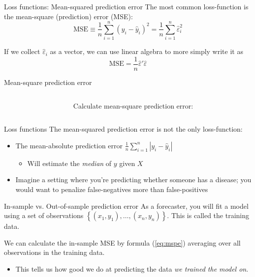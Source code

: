 \documentclass[aspectratio=169,t,11pt,table]{beamer}
\begin{document}
\begin{frame}{Loss functions: Mean-squared prediction error}
  The most common loss-function is the \alert{mean-square (prediction) error} (MSE):
  \begin{equation}\label{eq:mspe}
    \text{MSE} \equiv \frac{1}{n} \sum_{i=1}^n \left( y_i - \hat{y}_i \right)^2 = \frac{1}{n} \sum_{i=1}^n \hat{\varepsilon}_i^2
  \end{equation}

  \bigskip
  \pause
  If we collect $\hat{\varepsilon}_i$ as a vector, we can use linear algebra to more simply write it as 
  $$
    \text{MSE} = \frac{1}{n} \hat{\varepsilon}' \hat{\varepsilon}
  $$
\end{frame}

\begin{frame}{Mean-square prediction error}
  \begin{columns}[T]
    \begin{column}{.3\textwidth}\vspace*{-\bigskipamount}
      
    \end{column}
    \hfill
    \begin{column}{.6\textwidth}
      Calculate mean-square prediction error:

    \end{column}
  \end{columns}
\end{frame}

\begin{frame}{Loss functions}
  The mean-squared prediction error is not the only loss-function:
  \begin{itemize}
    \item The mean-absolute prediction error $\frac{1}{n} \sum_{i=1}^n \left\vert y_i - \hat{y}_i \right\vert$ 
    \begin{itemize}
      \item Will estimate the \emph{median} of $y$ given $X$
    \end{itemize}
    
    \pause
    \item Imagine a setting where you're predicting whether someone has a disease; you would want to penalize false-negatives more than false-positives
  \end{itemize}
\end{frame}

\begin{frame}{In-sample vs. Out-of-sample prediction error}
  As a forecaster, you will \alert{fit} a model using a set of observations $\left\{ (x_1, y_1), \dots, (x_n, y_n) \right\}$. This is called the \alert{training data}.

  \bigskip
  We can calculate the \alert{in-sample MSE} by formula (\ref{eq:mspe}) averaging over all observations in the training data.
  \begin{itemize}
    \item This tells us how good we do at predicting the data \emph{we trained the model on}.
  \end{itemize} 
\end{frame}  
\end{document}
